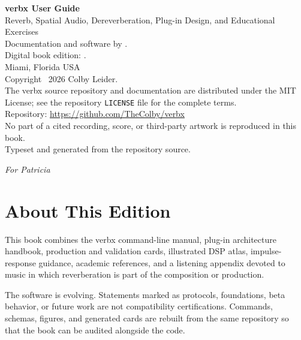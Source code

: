 {  {\small
    \textbf{verbx User Guide}\\[0.14in]
    Reverb, Spatial Audio, Dereverberation, Plug-in Design, and Educational Exercises\\[0.3in]
    Documentation and software by \@author.\\
    Digital book edition: \@date.\\
    Miami, Florida USA\\[0.12in]
    Copyright \textcopyright\ 2026 Colby Leider.\\[0.25in]
    The verbx source repository and documentation are distributed under the
    MIT License; see the repository \texttt{LICENSE} file for the complete terms.\\[0.25in]
    Repository: \url{https://github.com/TheColby/verbx}\\
    No part of a cited recording, score, or third-party artwork is reproduced in this book.\\[0.35in]
    Typeset and generated from the repository source.}
  \clearpage
  \thispagestyle{empty}
  \null
  \vfill
  \begin{center}
    {\Large\itshape For Patricia}
  \end{center}
  \vfill
  \null
  \clearpage
  \verbxPreface
  \verbxAcknowledgments
  \chapter*{About This Edition}
  This book combines the verbx command-line manual, plug-in architecture handbook,
  production and validation cards, illustrated DSP atlas, impulse-response guidance,
  academic references, and a listening appendix devoted to music in which reverberation
  is part of the composition or production.

  The software is evolving. Statements marked as protocols, foundations, beta behavior,
  or future work are not compatibility certifications. Commands, schemas, figures, and
  generated cards are rebuilt from the same repository so that the book can be audited
  alongside the code.

}

